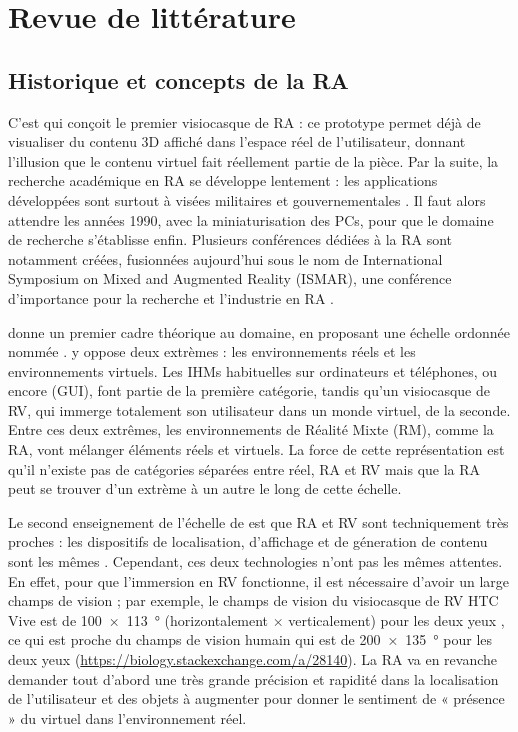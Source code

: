 \chapter{Revue de littérature}
\label{ch:litterature}

\section{Historique et concepts de la RA}
C'est \cite{Sutherland1968} qui conçoit le premier visiocasque de RA  : ce prototype permet déjà de visualiser du contenu 3D affiché dans l'espace réel de l'utilisateur, donnant l'illusion que le contenu virtuel fait réellement partie de la pièce. Par la suite, la recherche académique en RA se développe lentement : les applications développées sont surtout à visées militaires et gouvernementales \citep{VanKrevelen2010}. Il faut alors attendre les années 1990, avec la miniaturisation des PCs, pour que le domaine de recherche s'établisse enfin. Plusieurs conférences dédiées à la RA sont notamment créées, fusionnées aujourd'hui sous le nom de International Symposium on Mixed and Augmented Reality (ISMAR), une conférence d'importance pour la recherche et l'industrie en RA \citep{Azuma2001}.


\cite{Milgram1994} donne un premier cadre théorique au domaine, en proposant une échelle ordonnée nommée  . \citeauthor{Milgram1994} y oppose deux extrèmes : les environnements réels et les environnements virtuels. Les IHMs habituelles sur ordinateurs et téléphones, ou encore  (GUI), font partie de la première catégorie, tandis qu'un visiocasque de RV, qui immerge totalement son utilisateur dans un monde virtuel, de la seconde. Entre ces deux extrêmes, les environnements de Réalité Mixte (RM), comme la RA, vont mélanger éléments réels et virtuels. La force de cette représentation est qu'il n'existe pas de catégories séparées entre réel, RA et RV mais que la RA peut se trouver d'un extrème à un autre le long de cette échelle.

Le second enseignement de l'échelle de \citeauthor{Milgram1994} est que RA et RV sont techniquement très proches : les dispositifs de localisation, d'affichage et de géneration de contenu sont les mêmes \citep{Billinghurst2015}. Cependant, ces deux technologies n'ont pas les mêmes attentes. En effet, pour que l'immersion en RV fonctionne, il est nécessaire d'avoir un large champs de vision ; par exemple, le champs de vision du visiocasque de RV HTC Vive est de \SI{100x113}{\degree} (horizontalement $\times$ verticalement) pour les deux yeux \citep{Kreylos2016}, ce qui est proche du champs de vision humain qui est de \SI{200x135}{\degree} pour les deux yeux (\url{https://biology.stackexchange.com/a/28140}). La RA va en revanche demander tout d'abord une très grande précision et rapidité dans la localisation de l'utilisateur et des objets à augmenter pour donner le sentiment de « présence » du virtuel dans l'environnement réel.

